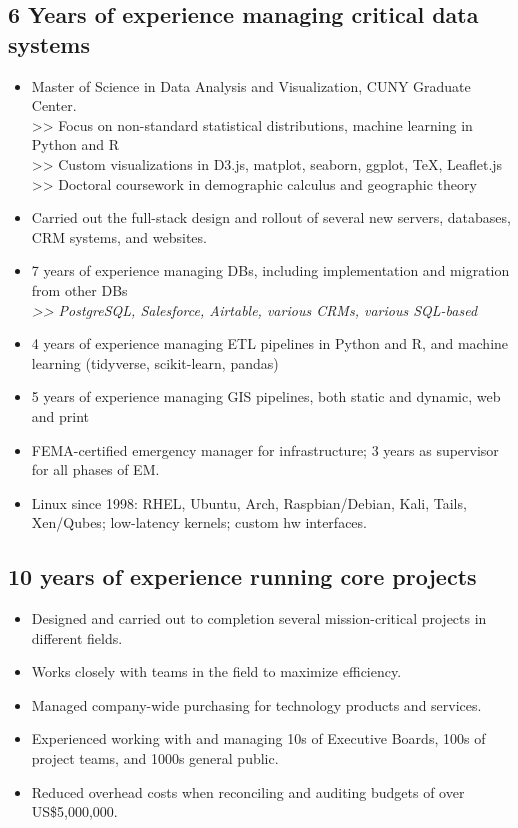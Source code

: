 \documentclass[]{deedy-resume-openfont}
\begin{document}
\subsection{6 Years of experience managing critical data systems}
\vspace{\topsep}
    \begin{itemize}
        \item Master of Science in Data Analysis and Visualization, CUNY Graduate Center. \\
        >> Focus on non-standard statistical distributions, machine learning in Python and R \\
        >> Custom visualizations in D3.js, matplot, seaborn, ggplot, \TeX, Leaflet.js \\
        >> Doctoral coursework in demographic calculus and geographic theory
        \item Carried out the full-stack design and rollout of several new servers, databases, CRM systems, and websites.
        \item 7 years of experience managing DBs, including implementation and migration from other DBs \\ \textit{>> PostgreSQL, Salesforce, Airtable, various CRMs, various SQL-based}
        \item 4 years of experience managing ETL pipelines in Python and R, and machine learning (tidyverse, scikit-learn, pandas)
        \item 5 years of experience managing GIS pipelines, both static and dynamic, web and print
        \item FEMA-certified emergency manager for infrastructure; 3 years as supervisor for all phases of EM.
        \item Linux since 1998: RHEL, Ubuntu, Arch, Raspbian/Debian, Kali, Tails, Xen/Qubes; low-latency kernels; custom hw interfaces.
    \end{itemize}
\subsection{10 years of experience running core projects}
\vspace{\topsep}
    \begin{itemize} 
    	\item Designed and carried out to completion several mission-critical projects in different fields.
        \item Works closely with teams in the field to maximize efficiency.
        \item Managed company-wide purchasing for technology products and services.
        \item Experienced working with and managing 10s of Executive Boards, 100s of project teams, and 1000s general public.
        \item Reduced overhead costs when reconciling and auditing budgets of over US\$5,000,000.
	\end{itemize}
\end{document}
